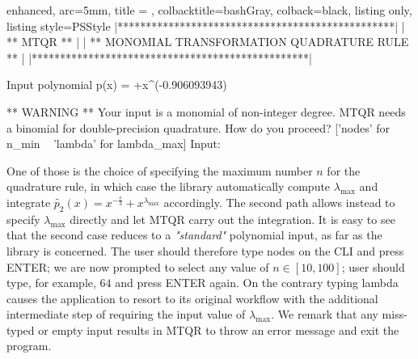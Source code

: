 \documentclass[a4paper, twosided]{book}
\begin{document}
\vspace{0.2cm}
\begin{tcblisting}{enhanced,
                   arc=5mm,
                   title = \color{black}{\large \ttfamily Executing the driver test case: p\_2(x)},
                   colbacktitle=bashGray,
                   colback=black,
                   listing only,
                   listing style=PSStyle}
    |*************************************************|
    |                 ** MTQR **                 |
    |  ** MONOMIAL TRANSFORMATION QUADRATURE RULE **  |
    |*************************************************|

 Input polynomial p(x) =  +x^(-0.906093943) 

 ** WARNING ** Your input is a monomial of non-integer degree.
               MTQR needs a binomial for double-precision quadrature.
               How do you proceed? ['nodes' for n_min ~ 'lambda' for lambda_max]
               Input: 
\end{tcblisting}
\vspace{0.3cm}

\noindent
One of those is the choice of specifying the maximum number $n$ for the quadrature rule, in which case the library  automatically compute $\lambda_{\text{max}}$ and integrate $\tilde{p_2}(x) = x^{-\frac{e}{3}} + x^{\lambda_\text{max}}$ accordingly. The second path allows instead to specify $\lambda_{\text{max}}$ directly and let MTQR carry out the integration. It is easy to see that the second case reduces to a \textsl{"standard"} polynomial input, as far as the library is concerned. The user should therefore type \colorbox{poliGrayBlue}{nodes} on the CLI and press \colorbox{poliGrayBlue}{ENTER}; we are now prompted to select any value of $n\in[10,100]$; user should type, for example, $64$ and press \colorbox{poliGrayBlue}{ENTER} again. On the contrary typing \colorbox{poliGrayBlue}{lambda} causes the application to resort to its original workflow with the additional intermediate step of requiring the input value of $\lambda_{\text{max}}$. We remark that any miss-typed or empty input results in MTQR to throw an error message and exit the program. 
\end{document}

